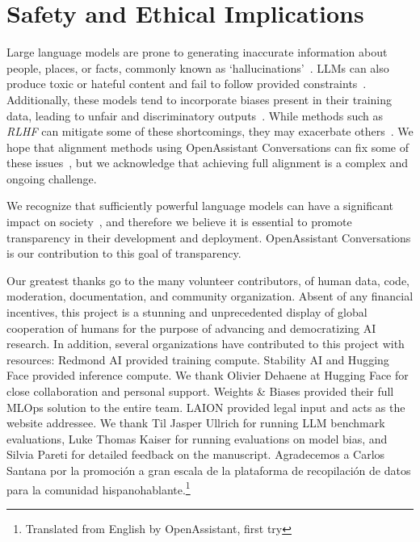 \section{Safety and Ethical Implications}
\label{sec:safety}

Large language models are prone to generating inaccurate information about people, places, or facts, commonly known as `hallucinations'~\cite{kryscinski2019evaluating, shuster2021retrieval}. LLMs can also produce toxic or hateful content and fail to follow provided constraints~\cite{henderson2018ethical}. Additionally, these models tend to incorporate biases present in their training data, leading to unfair and discriminatory outputs~\cite{dixon2018measuring}. While methods such as \textit{RLHF} can mitigate some of these shortcomings, they may exacerbate others~\cite{perez2022discovering, glaese2022improving}. We hope that alignment methods using OpenAssistant Conversations can fix some of these issues~\cite{ouyang2022training}, but we acknowledge that achieving full alignment is a complex and ongoing challenge. 

We recognize that sufficiently powerful language models can have a significant impact on society~\cite{weidinger2021ethical}, and therefore we believe it is essential to promote transparency in their development and deployment. OpenAssistant Conversations is our contribution to this goal of transparency.

\begin{ack}

Our greatest thanks go to the many volunteer contributors, of human data, code, moderation, documentation, and community organization. Absent of any financial incentives, this project is a stunning and unprecedented display of global cooperation of humans for the purpose of advancing and democratizing AI research. In addition, several organizations have contributed to this project with resources: Redmond AI provided training compute. Stability AI and Hugging Face provided inference compute. We thank Olivier Dehaene at Hugging Face for close collaboration and personal support. Weights \& Biases provided their full MLOps solution to the entire team. LAION provided legal input and acts as the website addressee. We thank Til Jasper Ullrich for running LLM benchmark evaluations, Luke Thomas Kaiser for running evaluations on model bias, and Silvia Pareti for detailed feedback on the manuscript. Agradecemos a Carlos Santana por la promoción a gran escala de la plataforma de recopilación de datos para la comunidad hispanohablante.\footnote{Translated from English by OpenAssistant, first try}

\end{ack}


